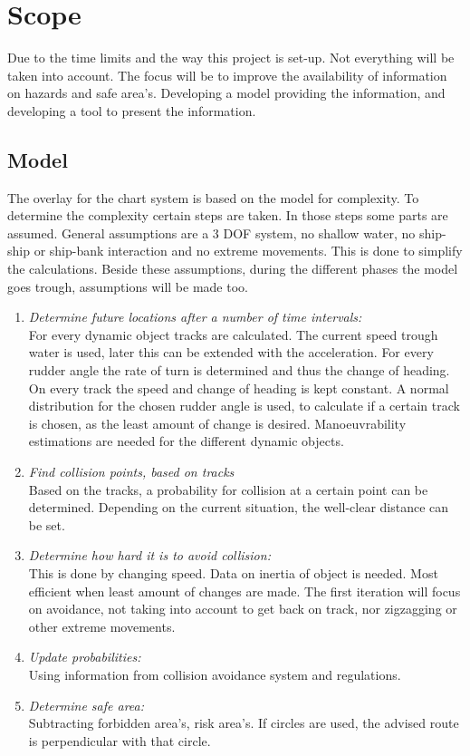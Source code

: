 
\newpage
\section{Scope}
Due to the time limits and the way this project is set-up. Not everything will be taken into account. The focus will be to improve the availability of information on hazards and safe area's. Developing a model providing the information, and developing a tool to present the information. 

\subsection{Model}
The overlay for the chart system is based on the model for complexity. To determine the complexity certain steps are taken. In those steps some parts are assumed. General assumptions are a 3 \ac{DOF} system, no shallow water, no ship-ship or ship-bank interaction and no extreme movements. This is done to simplify the calculations. Beside these assumptions, during the different phases the model goes trough, assumptions will be made too. 
\begin{enumerate}
	\item \emph{Determine future locations after a number of time intervals:}\\
	For every dynamic object tracks are calculated. The current speed trough water is used, later this can be extended with the acceleration. For every rudder angle the rate of turn is determined and thus the change of heading. On every track the speed and change of heading is kept constant. A normal distribution for the chosen rudder angle is used, to calculate if a certain track is chosen, as the least amount of change is desired. Manoeuvrability estimations are needed for the different dynamic objects.
	\item \emph{Find collision points, based on tracks}\\
	Based on the tracks, a probability for collision at a certain point can be determined. Depending on the current situation, the well-clear distance can be set.
	\item \emph{Determine how hard it is to avoid collision:}\\
	This is done by changing speed. Data on inertia of object is needed. Most efficient when least amount of changes are made. The first iteration will focus on avoidance, not taking into account to get back on track, nor zigzagging or other extreme movements.
	\item \emph{Update probabilities:}\\
	Using information from collision avoidance system and regulations. 
	\item \emph{Determine safe area:}\\
	Subtracting forbidden area's, risk area's. If circles are used, the advised route is perpendicular with that circle. 	
\end{enumerate}

